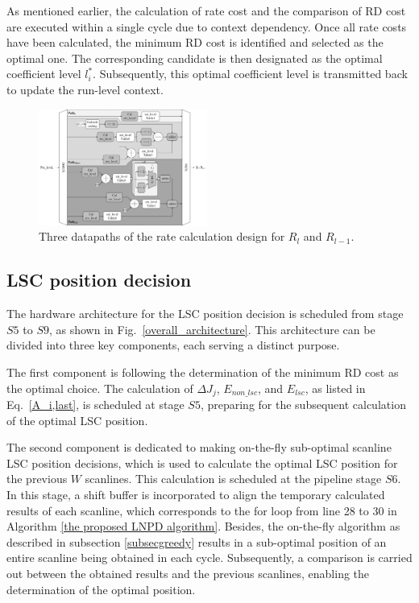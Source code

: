 \documentclass[lettersize,journal]{IEEEtran}
\begin{document}
As mentioned earlier, the calculation of rate cost and the comparison of RD cost are executed within a single cycle due to context dependency. Once all rate costs have been calculated, the minimum RD cost is identified and selected as the optimal one. The corresponding candidate is then designated as the optimal coefficient level $l_{i}^{*}$. Subsequently, this optimal coefficient level is transmitted back to update the run-level context. 
\par

\begin{figure}[!b]
	\centering
	\centerline{\includegraphics[width=0.49\textwidth]{figure/rate_calculation.png}} 
	\caption{Three datapaths of the rate calculation design for $R_{l}$ and $R_{l-1}$.}
	\label{rate cost} %
\end{figure}

\subsection{LSC position decision}

The hardware architecture for the LSC position decision is scheduled from stage $S5$ to $S9$, as shown in Fig.~\ref{overall_architecture}. This architecture can be divided into three key components, each serving a distinct purpose. 

The first component is following the determination of the minimum RD cost as the optimal choice. The calculation of $\Delta J_{j}$, $E_{non\_lsc}$, and $E_{lsc}$, as listed in Eq.~\eqref{A_i,last}, is scheduled at stage $S5$, preparing for the subsequent calculation of the optimal LSC position. 

The second component is dedicated to making on-the-fly sub-optimal scanline LSC position decisions, which is used to calculate the optimal LSC position for the previous $W$ scanlines. This calculation is scheduled at the pipeline stage $S6$. In this stage, a shift buffer is incorporated to align the temporary calculated results of each scanline, which corresponds to the for loop from line 28 to 30 in Algorithm \ref{the proposed LNPD algorithm}. 
Besides, the on-the-fly algorithm as described in subsection \ref{subsecgreedy} results in a sub-optimal position of an entire scanline being obtained in each cycle. Subsequently, a comparison is carried out between the obtained results and the previous scanlines, enabling the determination of the optimal position. 
\end{document}

